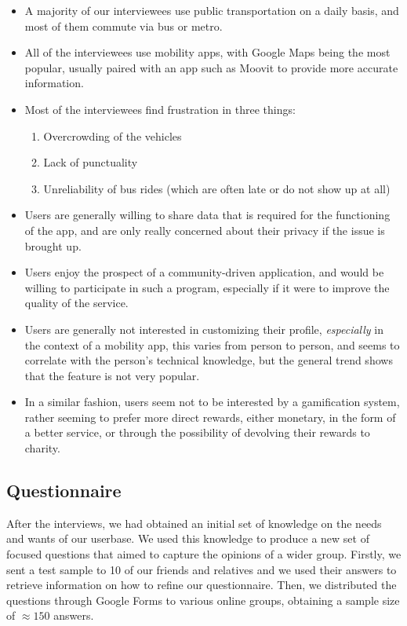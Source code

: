 \documentclass[a4paper, 11pt]{report}
\begin{document}
\begin{itemize}
	\item A majority of our interviewees use public transportation on a daily basis, and most of
	      them commute via bus or metro.
	\item All of the interviewees use mobility apps, with Google Maps being the most popular,
	      usually paired with an app such as Moovit to provide more accurate information.
	\item Most of the interviewees find frustration in three things:
	      \begin{enumerate}
		      \item Overcrowding of the vehicles
		      \item Lack of punctuality
		      \item Unreliability of bus rides (which are often late or do not show up at all)
	      \end{enumerate}
	\item Users are generally willing to share data that is required for the functioning of the app,
	      and are only really concerned about their privacy if the issue is brought up.
	\item Users enjoy the prospect of a community-driven application, and would be willing to
	      participate in such a program, especially if it were to improve the quality of the service.
	\item Users are generally not interested in customizing their profile, \emph{especially}
	      in the context of a mobility app, this varies from person to person, and seems to correlate
	      with the person's technical knowledge, but the general trend shows that the feature is not
	      very popular.
	\item In a similar fashion, users seem not to be interested by a gamification system, rather
	      seeming to prefer more direct rewards, either monetary, in the form of a better service, or through
	      the possibility of devolving their rewards to charity.
\end{itemize}

\subsection{Questionnaire}\label{ssec:questionnaire}


After the interviews, we had obtained an initial set of knowledge on the needs and wants of
our userbase. We used this knowledge to produce a new set of focused questions that aimed
to capture the opinions of a wider group. Firstly, we sent a test sample to 10 of our friends
and relatives and we used their answers to retrieve information on how to refine our questionnaire.
Then, we distributed the questions through Google Forms to various online groups,
obtaining a sample size of $\approx150$ answers.
\end{document}

